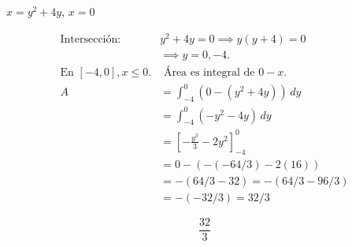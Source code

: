 $x=y^2+4y$, $x=0$

\nopagebreak
\begin{align*}
\text{Intersección: } & y^2+4y=0 \implies y(y+4)=0 \\
& \implies y=0, -4. \\
\text{En } [-4,0], x \le 0. & \text{ Área es integral de } 0 - x. \\
A &= \int_{-4}^{0} (0 - (y^2+4y)) \, dy \\
&= \int_{-4}^{0} (-y^2-4y) \, dy \\
&= \left[ -\frac{y^3}{3} - 2y^2 \right]_{-4}^{0} \\
&= 0 - \left( -(-64/3) - 2(16) \right) \\
&= - (64/3 - 32) = - (64/3 - 96/3) \\
&= - (-32/3) = 32/3
\end{align*}

\[
\boxed{\displaystyle \frac{32}{3}}
\]
